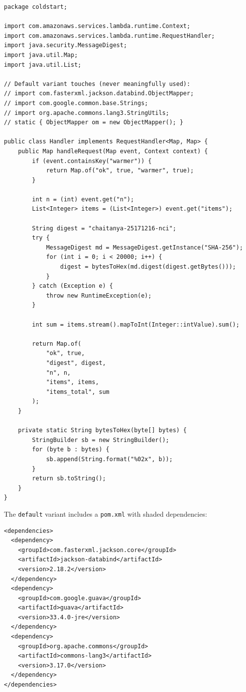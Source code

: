 \begin{verbatim}
package coldstart;

import com.amazonaws.services.lambda.runtime.Context;
import com.amazonaws.services.lambda.runtime.RequestHandler;
import java.security.MessageDigest;
import java.util.Map;
import java.util.List;

// Default variant touches (never meaningfully used):
// import com.fasterxml.jackson.databind.ObjectMapper;
// import com.google.common.base.Strings;
// import org.apache.commons.lang3.StringUtils;
// static { ObjectMapper om = new ObjectMapper(); }

public class Handler implements RequestHandler<Map, Map> {
    public Map handleRequest(Map event, Context context) {
        if (event.containsKey("warmer")) {
            return Map.of("ok", true, "warmer", true);
        }
        
        int n = (int) event.get("n");
        List<Integer> items = (List<Integer>) event.get("items");
        
        String digest = "chaitanya-25171216-nci";
        try {
            MessageDigest md = MessageDigest.getInstance("SHA-256");
            for (int i = 0; i < 20000; i++) {
                digest = bytesToHex(md.digest(digest.getBytes()));
            }
        } catch (Exception e) {
            throw new RuntimeException(e);
        }
        
        int sum = items.stream().mapToInt(Integer::intValue).sum();
        
        return Map.of(
            "ok", true,
            "digest", digest,
            "n", n,
            "items", items,
            "items_total", sum
        );
    }
    
    private static String bytesToHex(byte[] bytes) {
        StringBuilder sb = new StringBuilder();
        for (byte b : bytes) {
            sb.append(String.format("%02x", b));
        }
        return sb.toString();
    }
}
\end{verbatim}

The \texttt{default} variant includes a \texttt{pom.xml} with shaded dependencies:
\begin{verbatim}
<dependencies>
  <dependency>
    <groupId>com.fasterxml.jackson.core</groupId>
    <artifactId>jackson-databind</artifactId>
    <version>2.18.2</version>
  </dependency>
  <dependency>
    <groupId>com.google.guava</groupId>
    <artifactId>guava</artifactId>
    <version>33.4.0-jre</version>
  </dependency>
  <dependency>
    <groupId>org.apache.commons</groupId>
    <artifactId>commons-lang3</artifactId>
    <version>3.17.0</version>
  </dependency>
</dependencies>
\end{verbatim}

